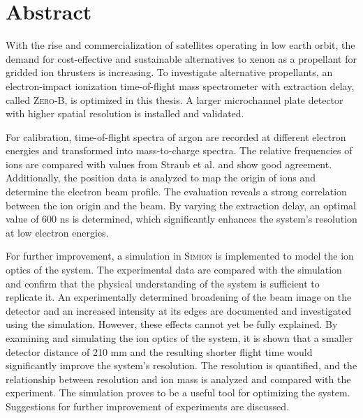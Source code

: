 \chapter*{Abstract}
With the rise and commercialization of satellites operating in low earth orbit, the demand for cost-effective and sustainable alternatives to xenon as a propellant for gridded ion thrusters is increasing. To investigate alternative propellants, an electron-impact ionization time-of-flight mass spectrometer with extraction delay, called \textsc{Zero-B}, is optimized in this thesis. A larger microchannel plate detector with higher spatial resolution is installed and validated.

For calibration, time-of-flight spectra of argon are recorded at different electron energies and transformed into mass-to-charge spectra. The relative frequencies of ions are compared with values from Straub et al. \cite{Straub} and show good agreement. Additionally, the position data is analyzed to map the origin of ions and determine the electron beam profile. The evaluation reveals a strong correlation between the ion origin and the beam. By varying the extraction delay, an optimal value of 600 ns is determined, which significantly enhances the system’s resolution at low electron energies.

For further improvement, a simulation in \textsc{Simion} is implemented to model the ion optics of the system. The experimental data are compared with the simulation and confirm that the physical understanding of the system is sufficient to replicate it. An experimentally determined broadening of the beam image on the detector and an increased intensity at its edges are documented and investigated using the simulation. However, these effects cannot yet be fully explained. By examining and simulating the ion optics of the system, it is shown that a smaller detector distance of 210 mm and the resulting shorter flight time would significantly improve the system’s resolution. The resolution is quantified, and the relationship between resolution and ion mass is analyzed and compared with the experiment. The simulation proves to be a useful tool for optimizing the system. Suggestions for further improvement of experiments are discussed.